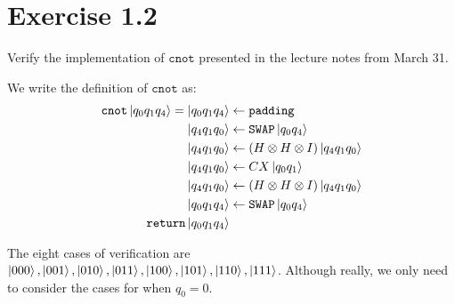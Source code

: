 \documentclass[11pt]{article}
\def\swap{\texttt{SWAP}}
\def\cnot{\texttt{cnot}}
\begin{document}
\section*{Exercise 1.2}
Verify the implementation of $\cnot$ presented in the lecture notes from March 31. 


We write the definition of $\cnot$ as: 
\begin{align*}
    \cnot\ket{q_0q_1q_4} = 
    \ket{q_0q_1q_4} &\leftarrow \texttt{padding}\\
    \ket{q_4q_1q_0} &\leftarrow \swap\ket{q_0q_4} \\
    \ket{q_4q_1q_0} &\leftarrow (H \otimes H \otimes I)\ket{q_4q_1q_0} \\
    \ket{q_4q_1q_0} &\leftarrow CX\ket{q_0q_1} \\
    \ket{q_4q_1q_0} &\leftarrow (H \otimes H \otimes I)\ket{q_4q_1q_0} \\
    \ket{q_0q_1q_4} &\leftarrow \swap\ket{q_0q_4} \\
     \texttt{return} \ket{q_0q_1q_4}
\end{align*}

The eight cases of verification are $\ket{000},\ket{001},\ket{010},\ket{011} ,\ket{100},\ket{101},\ket{110},\ket{111}$. 
Although really, we only need to consider the cases for when $q_0 = 0$.
\end{document}
